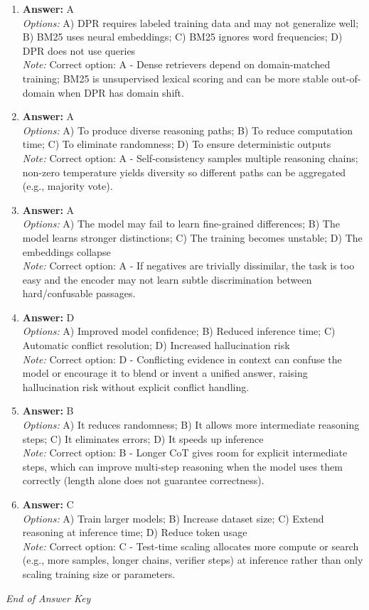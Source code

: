 \documentclass[12pt]{article}
\begin{document}
\begin{enumerate}[label=Q\arabic*.]
\item \textbf{Answer:} A
\\ \textit{Options:} A) DPR requires labeled training data and may not generalize well; B) BM25 uses neural embeddings; C) BM25 ignores word frequencies; D) DPR does not use queries
\\ \textit{Note:} Correct option: A - Dense retrievers depend on domain-matched training; BM25 is unsupervised lexical scoring and can be more stable out-of-domain when DPR has domain shift.
\item \textbf{Answer:} A
\\ \textit{Options:} A) To produce diverse reasoning paths; B) To reduce computation time; C) To eliminate randomness; D) To ensure deterministic outputs
\\ \textit{Note:} Correct option: A - Self-consistency samples multiple reasoning chains; non-zero temperature yields diversity so different paths can be aggregated (e.g., majority vote).
\item \textbf{Answer:} A
\\ \textit{Options:} A) The model may fail to learn fine-grained differences; B) The model learns stronger distinctions; C) The training becomes unstable; D) The embeddings collapse
\\ \textit{Note:} Correct option: A - If negatives are trivially dissimilar, the task is too easy and the encoder may not learn subtle discrimination between hard/confusable passages.
\item \textbf{Answer:} D
\\ \textit{Options:} A) Improved model confidence; B) Reduced inference time; C) Automatic conflict resolution; D) Increased hallucination risk
\\ \textit{Note:} Correct option: D - Conflicting evidence in context can confuse the model or encourage it to blend or invent a unified answer, raising hallucination risk without explicit conflict handling.
\item \textbf{Answer:} B
\\ \textit{Options:} A) It reduces randomness; B) It allows more intermediate reasoning steps; C) It eliminates errors; D) It speeds up inference
\\ \textit{Note:} Correct option: B - Longer CoT gives room for explicit intermediate steps, which can improve multi-step reasoning when the model uses them correctly (length alone does not guarantee correctness).
\item \textbf{Answer:} C
\\ \textit{Options:} A) Train larger models; B) Increase dataset size; C) Extend reasoning at inference time; D) Reduce token usage
\\ \textit{Note:} Correct option: C - Test-time scaling allocates more compute or search (e.g., more samples, longer chains, verifier steps) at inference rather than only scaling training size or parameters.
\end{enumerate}

\vfill
\noindent\textit{End of Answer Key}
\end{document}
